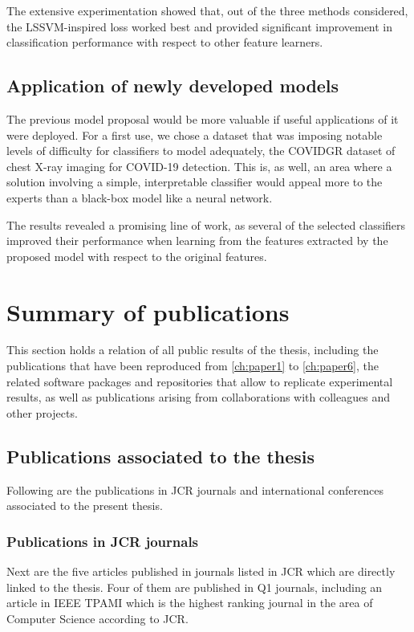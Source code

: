 The extensive experimentation showed that, out of the three methods considered, the LSSVM-inspired loss worked best and provided significant improvement in classification performance with respect to other feature learners.

\subsection{Application of newly developed models}

The previous model proposal would be more valuable if useful applications of it were deployed. For a first use, we chose a dataset that was imposing notable levels of difficulty for classifiers to model adequately, the COVIDGR dataset of chest X-ray imaging for COVID-19 detection. This is, as well, an area where a solution involving a simple, interpretable classifier would appeal more to the experts than a black-box model like a neural network.

The results revealed a promising line of work, as several of the selected classifiers improved their performance when learning from the features extracted by the proposed model with respect to the original features.

\section{Summary of publications}

This section holds a relation of all public results of the thesis, including the publications that have been reproduced from \autoref{ch:paper1} to \autoref{ch:paper6}, the related software packages and repositories that allow to replicate experimental results, as well as publications arising from collaborations with colleagues and other projects.

\subsection{Publications associated to the thesis}

Following are the publications in JCR journals and international conferences associated to the present thesis.

\subsubsection{Publications in JCR journals}

Next are the five articles published in journals listed in JCR which are directly linked to the thesis. Four of them are published in Q1 journals, including an article in IEEE TPAMI which is the highest ranking journal in the area of Computer Science according to JCR.


